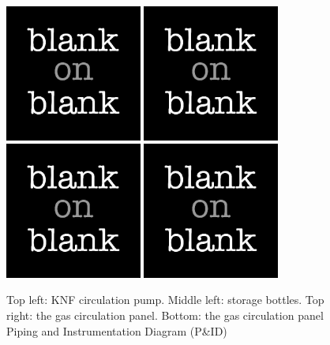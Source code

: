 \begin{figure}[!ht]
  \centering
  \includegraphics[width=0.4\textwidth]
  {blank.jpg}
  \includegraphics[width=0.4\textwidth]
  {blank.jpg}
  \includegraphics[width=0.4\textwidth]
  {blank.jpg}
  \includegraphics[width=0.4\textwidth]
  {blank.jpg}
  \caption{Top left: KNF circulation pump. Middle left: storage bottles. Top right: the gas circulation panel. Bottom: the gas circulation panel Piping and Instrumentation Diagram (P\&ID)}
  \label{fig: gas detector circulation panel}
\end{figure}


